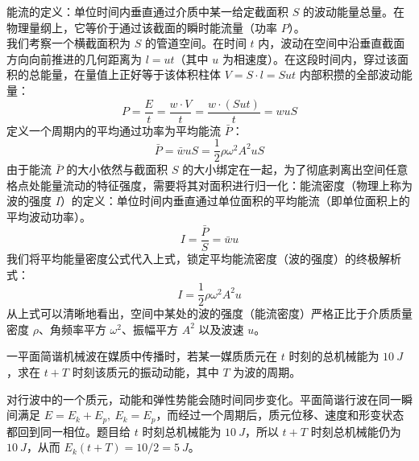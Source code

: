 \begin{definition}[能流和能流密度]
能流的定义：单位时间内垂直通过介质中某一给定截面积 $S$ 的波动能量总量。在物理量纲上，它等价于通过该截面的瞬时能流量（功率 $P$）。\\
我们考察一个横截面积为 $S$ 的管道空间。在时间 $t$ 内，波动在空间中沿垂直截面方向向前推进的几何距离为 $l = u t$（其中 $u$ 为相速度）。在这段时间内，穿过该面积的总能量，在量值上正好等于该体积柱体 $V = S \cdot l = S u t$ 内部积攒的全部波动能量：$$P = \frac{E}{t} = \frac{w \cdot V}{t} = \frac{w \cdot (S u t)}{t} = w u S$$定义一个周期内的平均通过功率为平均能流 $\bar{P}$：$$\boxed{\bar{P} = \bar{w} u S = \frac{1}{2} \rho \omega^2 A^2 u S}$$
由于能流 $\bar{P}$ 的大小依然与截面积 $S$ 的大小绑定在一起，为了彻底剥离出空间任意格点处能量流动的特征强度，需要将其对面积进行归一化：能流密度（物理上称为波的强度 $I$）的定义：单位时间内垂直通过单位面积的平均能流（即单位面积上的平均波动功率）。$$I = \frac{\bar{P}}{S} = \bar{w} u$$我们将平均能量密度公式代入上式，锁定平均能流密度（波的强度）的终极解析式：$$\boxed{I = \frac{1}{2} \rho \omega^2 A^2 u}$$从上式可以清晰地看出，空间中某处的波的强度（能流密度）严格正比于介质质量密度 $\rho$、角频率平方 $\omega^2$、振幅平方 $A^2$ 以及波速 $u$。
\end{definition}

\begin{exercise}
一平面简谐机械波在媒质中传播时，若某一媒质质元在 \(t\) 时刻的总机械能为 \(\SI{10}{J}\)，求在 \(t+T\) 时刻该质元的振动动能，其中 \(T\) 为波的周期。
\end{exercise}

\begin{solution}
对行波中的一个质元，动能和弹性势能会随时间同步变化。平面简谐行波在同一瞬间满足 \(E=E_k+E_p,\ E_k=E_p\)，而经过一个周期后，质元位移、速度和形变状态都回到同一相位。题目给 \(t\) 时刻总机械能为 \(\SI{10}{J}\)，所以 \(t+T\) 时刻总机械能仍为 \(\SI{10}{J}\)，从而 \(E_k(t+T)=10/2=\SI{5}{J}\)。
\end{solution}
